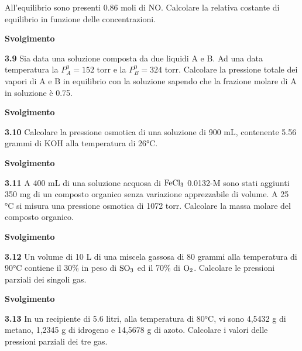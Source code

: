 All’equilibrio sono presenti 0.86 moli di NO. Calcolare la relativa costante di equilibrio in funzione delle concentrazioni.

\vspace{0.2cm}\large\textbf{Svolgimento}\normalsize

\vspace{0.2cm}

\vspace{0.2cm}\textbf{3.9} Sia data una soluzione composta da due liquidi A e B. Ad una data temperatura la $P^0_A = 152$ torr
e la $P^0_B = 324$ torr. Calcolare la pressione totale dei vapori di A e B in equilibrio con la soluzione sapendo che la frazione molare di A in soluzione è 0.75.

\vspace{0.2cm}\large\textbf{Svolgimento}\normalsize

\vspace{0.2cm}

\vspace{0.2cm}\textbf{3.10} Calcolare la pressione osmotica di una soluzione di 900 mL, contenente 5.56 grammi di KOH alla temperatura di 26°C.

\vspace{0.2cm}\large\textbf{Svolgimento}\normalsize

\vspace{0.2cm}

\vspace{0.2cm}\textbf{3.11} A 400 mL di una soluzione acquosa di $\rm FeCl_3$ 0.0132-M sono stati aggiunti 350 mg di un composto organico senza variazione apprezzabile di volume. A 25 °C si misura una pressione osmotica di 1072 torr. Calcolare la massa molare del composto organico.

\vspace{0.2cm}\large\textbf{Svolgimento}\normalsize

\vspace{0.2cm}

\vspace{0.2cm}\textbf{3.12} Un volume di 10 L di una miscela gassosa di 80 grammi alla temperatura di 90°C contiene il
30\% in peso di $\rm SO_3$ ed il 70\% di $\rm O_2$. Calcolare le pressioni parziali dei singoli gas.

\large\textbf{Svolgimento}\normalsize

\vspace{0.2cm}

\vspace{0.2cm}\textbf{3.13} In un recipiente di 5.6 litri, alla temperatura di 80°C, vi sono 4,5432 g di metano, 1,2345 g di idrogeno e 14,5678 g di azoto. Calcolare i valori delle pressioni parziali dei tre gas. 

